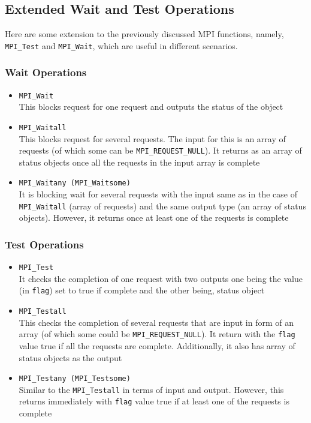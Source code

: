 \documentclass[12pt, a4paper]{report}
\begin{document}
\subsection{Extended Wait and Test Operations}
Here are some extension to the previously discussed MPI functions, namely, \verb$MPI_Test$ and \verb$MPI_Wait$, which are useful in different scenarios.
\subsubsection{Wait Operations}
\begin{itemize}
    \item \verb$MPI_Wait$\\
          This blocks request for one request and outputs the status of the object
    \item \verb$MPI_Waitall$\\
          This blocks request for several requests. The input for this is an array of requests (of which some can be \verb$MPI_REQUEST_NULL$). It returns as an
          array of status objects once all the requests in the input array is complete
    \item \verb$MPI_Waitany (MPI_Waitsome)$\\
          It is blocking wait for several requests with the input same as in the case of \verb$MPI_Waitall$ (array of requests) and the same output type (an 
          array of status objects). However, it returns once at least one of the requests is complete
\end{itemize} 

\subsubsection{Test Operations}
\begin{itemize}
    \item \verb$MPI_Test$\\
          It checks the completion of one request with two outputs one being the value (in \verb$flag$) set to true if complete and the other being, status 
          object
    \item \verb$MPI_Testall$\\
          This checks the completion of several requests that are input in form of an array (of which some could be \verb$MPI_REQUEST_NULL$). It return with 
          the \verb$flag$ value true if all the requests are complete. Additionally, it also has array of status objects as the output 
    \item \verb$MPI_Testany (MPI_Testsome)$\\
          Similar to the \verb$MPI_Testall$ in terms of input and output. However, this returns immediately with \verb$flag$ value true if at least one of the
          requests is complete
\end{itemize}
\end{document}
